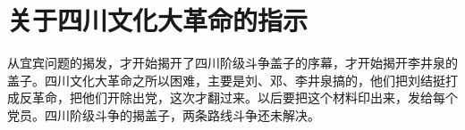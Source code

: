 \section[关于四川文化大革命的指示（一九六七年四月）]{关于四川文化大革命的指示}


从宜宾问题的揭发，才开始揭开了四川阶级斗争盖子的序幕，才开始揭开李井泉的盖子。四川文化大革命之所以困难，主要是刘、邓、李井泉搞的，他们把刘结挺打成反革命，把他们开除出党，这次才翻过来。以后要把这个材料印出来，发给每个党员。四川阶级斗争的揭盖子，两条路线斗争还未解决。


